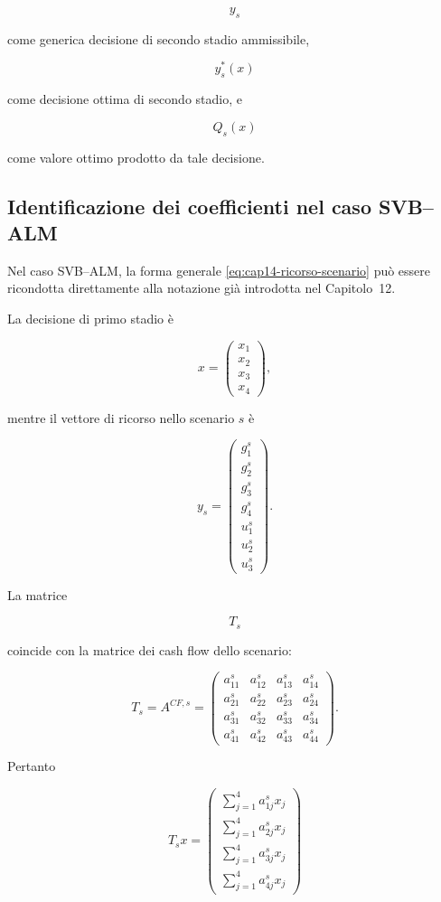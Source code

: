 \[
y_s
\]

\noindent come generica decisione di secondo stadio ammissibile,

\[
y_s^*(x)
\]

\noindent come decisione ottima di secondo stadio, e

\[
Q_s(x)
\]

\noindent come valore ottimo prodotto da tale decisione.

\subsection{Identificazione dei coefficienti nel caso SVB--ALM}

Nel caso SVB--ALM, la forma generale
\eqref{eq:cap14-ricorso-scenario} pu\`o essere ricondotta direttamente
alla notazione gi\`a introdotta nel Capitolo~12.

La decisione di primo stadio \`e

\[
x=
\begin{pmatrix}
x_1\\
x_2\\
x_3\\
x_4
\end{pmatrix},
\]

\noindent mentre il vettore di ricorso nello scenario $s$ \`e

\[
y_s=
\begin{pmatrix}
g_1^s\\
g_2^s\\
g_3^s\\
g_4^s\\
u_1^s\\
u_2^s\\
u_3^s
\end{pmatrix}.
\]

La matrice

\[
T_s
\]

\noindent coincide con la matrice dei cash flow dello scenario:

\[
T_s
=
A^{CF,s}
=
\begin{pmatrix}
a_{11}^s & a_{12}^s & a_{13}^s & a_{14}^s\\
a_{21}^s & a_{22}^s & a_{23}^s & a_{24}^s\\
a_{31}^s & a_{32}^s & a_{33}^s & a_{34}^s\\
a_{41}^s & a_{42}^s & a_{43}^s & a_{44}^s
\end{pmatrix}.
\]

Pertanto

\[
T_sx
=
\begin{pmatrix}
\sum_{j=1}^{4}a_{1j}^s x_j\\
\sum_{j=1}^{4}a_{2j}^s x_j\\
\sum_{j=1}^{4}a_{3j}^s x_j\\
\sum_{j=1}^{4}a_{4j}^s x_j
\end{pmatrix}
\]

